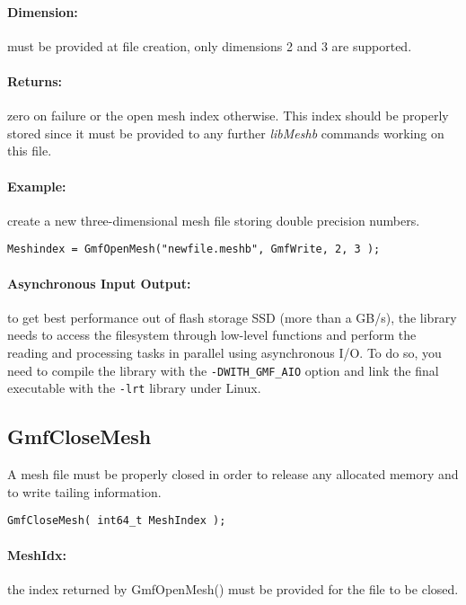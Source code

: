 \documentclass[a4paper,12pt]{article}
\begin{document}
\paragraph{Dimension:}
must be provided at file creation, only dimensions 2 and 3 are supported.

\paragraph{Returns:}
zero on failure or the open mesh index otherwise. This index should be properly stored since it must be provided to any further \emph{libMeshb} commands working on this file.

\paragraph{Example:} create a new three-dimensional mesh file storing double precision numbers.

\begin{tt}
\begin{verbatim}
Meshindex = GmfOpenMesh("newfile.meshb", GmfWrite, 2, 3 );
\end{verbatim}
\end{tt}
\normalfont

\paragraph{Asynchronous Input Output:}
to get best performance out of flash storage SSD (more than a GB/s), the library needs to access the filesystem through low-level functions and perform the reading and processing tasks in parallel using asynchronous I/O. To do so, you need to compile the library with the {\tt -DWITH\_GMF\_AIO} option and link the final executable with the {\tt -lrt} library under Linux.


\subsection{GmfCloseMesh}
A mesh file must be properly closed in order to release any allocated memory and to write tailing information.

\begin{tt}
\begin{verbatim}
GmfCloseMesh( int64_t MeshIndex );
\end{verbatim}
\end{tt}
\normalfont

\paragraph{MeshIdx:}
the index returned by GmfOpenMesh() must be provided for the file to be closed.
\end{document}
